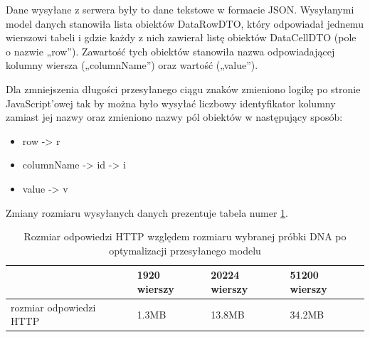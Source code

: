 \documentclass[a4paper,12pt,twoside]{article}
\begin{document}
Dane wysyłane z serwera były to dane tekstowe w formacie JSON.
Wysyłanymi model danych stanowiła lista obiektów DataRowDTO,
który odpowiadał jednemu wierszowi tabeli i gdzie każdy z nich zawierał listę obiektów DataCellDTO (pole o nazwie „row”). Zawartość tych obiektów stanowiła nazwa
odpowiadającej kolumny wiersza („columnName”) oraz wartość („value”).

Dla zmniejszenia długości przesyłanego ciągu znaków zmieniono logikę po stronie JavaScript'owej tak by
można było wysyłać liczbowy identyfikator kolumny zamiast jej nazwy
oraz zmieniono nazwy pól obiektów w następujący sposób:

\begin{itemize}
\item row -> r
\item columnName -> id -> i
\item value -> v
\end{itemize}
Zmiany rozmiaru wysyłanych danych prezentuje tabela numer \ref{table:requestSizeOpt}.
\begin{table} [H]
\begin{tabular}{| p{4cm} | p{2.7cm} | p{2.7cm} | p{2.7cm}|}
\hline
& 1920 wierszy & 20224 wierszy & 51200 wierszy\\
\hline
rozmiar odpowiedzi HTTP& 1.3MB&13.8MB& 34.2MB\\ \hline
\end{tabular}
\caption{Rozmiar odpowiedzi HTTP względem rozmiaru wybranej próbki DNA po optymalizacji przesyłanego modelu}
\label{table:requestSizeOpt}
\end{table}

\newpage
\end{document}
